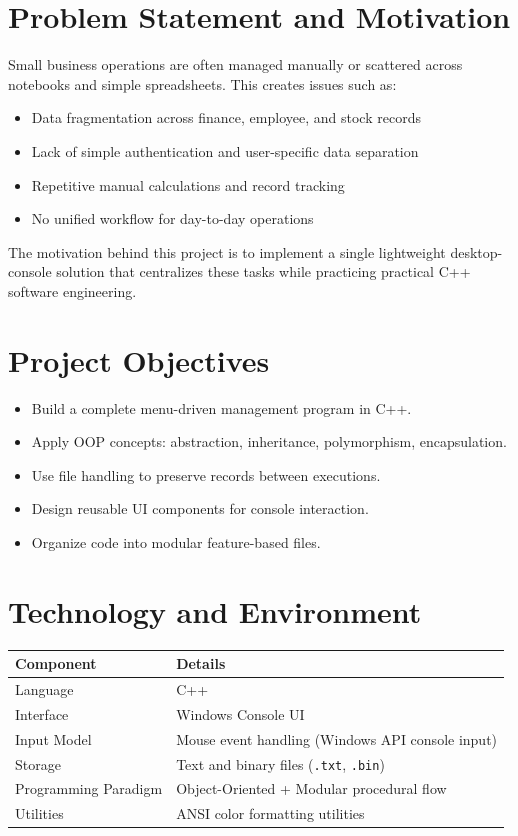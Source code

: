 \documentclass[12pt,a4paper]{article}
\begin{document}
\section{Problem Statement and Motivation}
Small business operations are often managed manually or scattered across notebooks and simple spreadsheets. This creates issues such as:
\begin{itemize}[leftmargin=1.4em]
    \item Data fragmentation across finance, employee, and stock records
    \item Lack of simple authentication and user-specific data separation
    \item Repetitive manual calculations and record tracking
    \item No unified workflow for day-to-day operations
\end{itemize}

The motivation behind this project is to implement a single lightweight desktop-console solution that centralizes these tasks while practicing practical C++ software engineering.

\section{Project Objectives}
\begin{itemize}[leftmargin=1.4em]
    \item Build a complete menu-driven management program in C++.
    \item Apply OOP concepts: abstraction, inheritance, polymorphism, encapsulation.
    \item Use file handling to preserve records between executions.
    \item Design reusable UI components for console interaction.
    \item Organize code into modular feature-based files.
\end{itemize}

\section{Technology and Environment}
\begin{longtable}{|p{4.5cm}|p{9.5cm}|}
\hline
\rowcolor{lightbg}
\textbf{Component} & \textbf{Details} \\
\hline
Language & C++ \\
\hline
Interface & Windows Console UI \\
\hline
Input Model & Mouse event handling (Windows API console input) \\
\hline
Storage & Text and binary files (\texttt{.txt}, \texttt{.bin}) \\
\hline
Programming Paradigm & Object-Oriented + Modular procedural flow \\
\hline
Utilities & ANSI color formatting utilities \\
\hline
\end{longtable}
\end{document}

